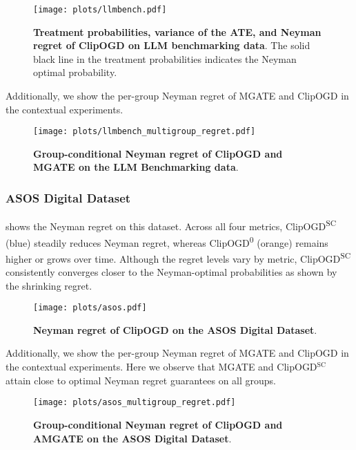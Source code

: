 \begin{figure*}[ht]
    \texttt{[image: plots/llmbench.pdf]}
    \caption{
         \textbf{Treatment probabilities, variance of the ATE, and Neyman regret of ClipOGD on LLM benchmarking data}. The solid black line in the treatment probabilities indicates the Neyman optimal probability.
         }
        \label{fig:llbench}
        \vspace{-1em}
\end{figure*}


Additionally, we show the per-group Neyman regret of MGATE and ClipOGD in the contextual experiments. 
\begin{figure*}[ht]
    \texttt{[image: plots/llmbench\_multigroup\_regret.pdf]}
    \caption{
         \textbf{Group-conditional Neyman regret of ClipOGD and MGATE on the LLM Benchmarking data}. 
         }
        \label{fig:llbench_multigroup}
        \vspace{-1em}
\end{figure*}

\clearpage

\subsubsection{ASOS Digital Dataset}

 shows the Neyman regret on this dataset.  Across all four metrics, ClipOGD\textsuperscript{SC} (blue) steadily reduces Neyman regret, whereas ClipOGD\textsuperscript{0} (orange) remains higher or grows over time. Although the regret levels vary by metric,  
ClipOGD\textsuperscript{SC} consistently converges closer to the Neyman-optimal probabilities as shown by the shrinking regret.

\begin{figure*}[ht]
    \texttt{[image: plots/asos.pdf]}
    \caption{
         \textbf{Neyman regret of ClipOGD on the ASOS Digital Dataset}. 
         }
        \label{fig:asos}
        \vspace{-1em}
\end{figure*}

Additionally, we show the per-group Neyman regret of MGATE and ClipOGD in the contextual experiments. Here we observe that MGATE and ClipOGD$^\textrm{SC}$ attain close to optimal Neyman regret guarantees on all groups.
\begin{figure*}[ht]
    \texttt{[image: plots/asos\_multigroup\_regret.pdf]}
    \caption{
         \textbf{Group-conditional Neyman regret of ClipOGD and AMGATE on the ASOS Digital Dataset}. 
         }
        \label{fig:asos_multigroup}
        \vspace{-1em}
\end{figure*}